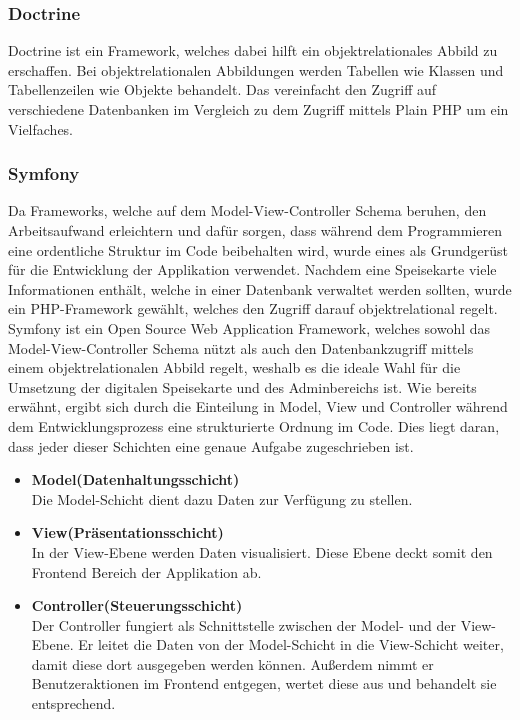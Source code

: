     \subsubsection{Doctrine}

{Doctrine\cite{doctrine}} ist ein Framework, welches dabei hilft ein objektrelationales Abbild zu erschaffen. Bei objektrelationalen Abbildungen werden Tabellen wie Klassen und Tabellenzeilen wie Objekte behandelt. Das vereinfacht den Zugriff auf verschiedene Datenbanken im Vergleich zu dem Zugriff mittels Plain PHP um ein Vielfaches.

    \subsubsection{Symfony}

Da Frameworks, welche auf dem Model-View-Controller Schema beruhen, den Arbeitsaufwand erleichtern und dafür sorgen, dass während dem Programmieren eine ordentliche Struktur im Code beibehalten wird, wurde eines als Grundgerüst für die Entwicklung der Applikation verwendet. Nachdem eine Speisekarte viele Informationen enthält, welche in einer Datenbank verwaltet werden sollten, wurde ein PHP-Framework gewählt, welches den Zugriff darauf objektrelational regelt.
{Symfony\cite{symfony}} ist ein Open Source Web Application Framework, welches sowohl das Model-View-Controller Schema nützt als auch den Datenbankzugriff mittels einem objektrelationalen Abbild regelt, weshalb es die ideale Wahl für die Umsetzung der digitalen Speisekarte und des Adminbereichs ist.
Wie bereits erwähnt, ergibt sich durch die Einteilung in Model, View und Controller während dem Entwicklungsprozess eine strukturierte Ordnung im Code.
Dies liegt daran, dass jeder dieser Schichten eine genaue Aufgabe zugeschrieben ist.
\begin{itemize}
    \item \textbf{Model(Datenhaltungsschicht)}\\
Die Model-Schicht dient dazu Daten zur Verfügung zu stellen.
    \item \textbf{View(Präsentationsschicht)}\\
In der View-Ebene werden Daten visualisiert. Diese Ebene deckt somit den Frontend Bereich der Applikation ab.
    \item \textbf{Controller(Steuerungsschicht)}\\
Der Controller fungiert als Schnittstelle zwischen der Model- und der View-Ebene. Er leitet die Daten von der Model-Schicht in die View-Schicht weiter, damit diese dort ausgegeben werden können. Außerdem nimmt er Benutzeraktionen im Frontend entgegen, wertet diese aus und behandelt sie entsprechend.
  \end{itemize}
